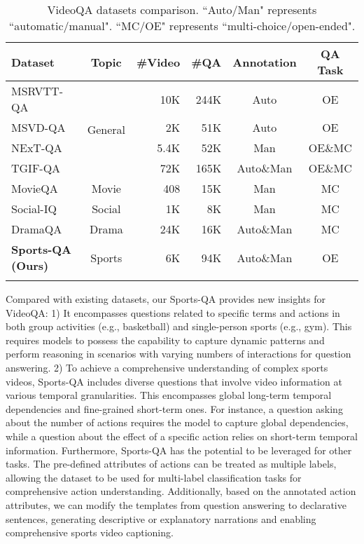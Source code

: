 \begin{table}[tbp]
\caption{VideoQA datasets comparison. ``Auto/Man" represents ``automatic/manual". ``MC/OE" represents ``multi-choice/open-ended".}
\label{set}
\begin{tabular}{@{}lcrrcc@{}}
\toprule
Dataset                           & Topic   & \multicolumn{1}{c}{\#Video} & \multicolumn{1}{c}{\#QA} & Annotation  & QA Task  \\ \midrule
MSRVTT-QA \citep{xu2017video}      & \multirow{4}{*}{General} & 10K                         & 244K                     & Auto        & OE       \\
MSVD-QA \citep{xu2017video}        &  & 2K                          & 51K                      & Auto        & OE       \\
NExT-QA \citep{xiao2021next}       &  & 5.4K                        & 52K                      & Man         & OE\&MC \\
TGIF-QA \citep{jang2017tgif}       &  & 72K                         & 165K                     & Auto\&Man & OE\&MC \\ \midrule
MovieQA \citep{tapaswi2016movieqa} & Movie   & 408                         & 15K                      & Man         & MC       \\
Social-IQ \citep{zadeh2019social}  & Social  & 1K                          & 8K                       & Man         & MC       \\
DramaQA \citep{choi2021dramaqa}    & Drama   & 24K                         & 16K                      & Auto\&Man & MC       \\
\textbf{Sports-QA (Ours)}                  & Sports  & 6K                          & 94K                      & Auto\&Man & OE       \\ \botrule
\end{tabular}
\end{table}

Compared with existing datasets, our Sports-QA provides new insights for VideoQA: 1) It encompasses questions related to specific terms and actions in both group activities (e.g., basketball) and single-person sports (e.g., gym). This requires models to possess the capability to capture dynamic patterns and perform reasoning in scenarios with varying numbers of interactions for question answering. 2) To achieve a comprehensive understanding of complex sports videos, Sports-QA includes diverse questions that involve video information at various temporal granularities. This encompasses global long-term temporal dependencies and fine-grained short-term ones. For instance, a question asking about the number of actions requires the model to capture global dependencies, while a question about the effect of a specific action relies on short-term temporal information. Furthermore, Sports-QA has the potential to be leveraged for other tasks. The pre-defined attributes of actions can be treated as multiple labels, allowing the dataset to be used for multi-label classification tasks for comprehensive action understanding. Additionally, based on the annotated action attributes, we can modify the templates from question answering to declarative sentences, generating descriptive or explanatory narrations and enabling comprehensive sports video captioning.

